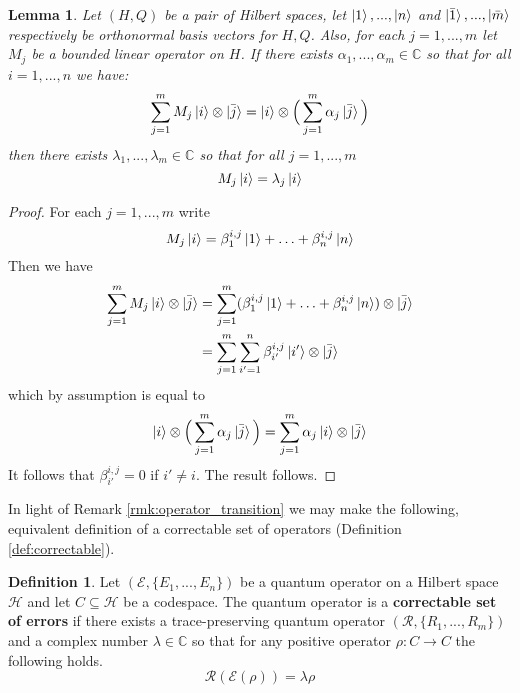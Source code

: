 \documentclass[12pt]{article}
\theoremstyle{plain}
\newtheorem{lemma}[thm]{Lemma}
\theoremstyle{definition}
\newtheorem{defn}[thm]{Definition} %
\newcommand{\bb}[1]{\mathbb{#1}}
\newcommand{\call}[1]{\mathcal{#1}}
\newcommand{\lto}{\longrightarrow}
\begin{document}
\begin{lemma}\label{lem:operator_preliminary}
	Let $(H,Q)$ be a pair of Hilbert spaces, let $\ket{1},...,\ket{n}$ and $\ket{\bar{1}},...,\ket{\bar{m}}$ respectively be orthonormal basis vectors for $H,Q$. Also, for each $j = 1,...,m$ let $M_j$ be a bounded linear operator on $H$. If there exists $\alpha_1,...,\alpha_m \in \bb{C}$ so that for all $i = 1,...,n$ we have:
	\begin{equation}
		\sum_{j = 1}^mM_j\ket{i} \otimes \ket{\bar{j}} = \ket{i} \otimes \Big(\sum_{j= 1}^m \alpha_{j} \ket{\bar{j}}\Big)
	\end{equation}
	then there exists $\lambda_1,...,\lambda_m \in \bb{C}$ so that for all $j = 1,...,m$
	\begin{equation}
		M_j\ket{i} = \lambda_j \ket{i}
	\end{equation}
\end{lemma}
\begin{proof}
	For each $j = 1,...,m$ write
	\begin{equation}
		M_j\ket{i} = \beta^{i,j}_1\ket{1} + \hdots + \beta^{i,j}_n \ket{n}
	\end{equation}
	Then we have
	\begin{align*}
		\sum_{j = 1}^mM_j\ket{i} \otimes \ket{\bar{j}} &= \sum_{j = 1}^m(\beta^{i,j}_1\ket{1} + \hdots + \beta^{i,j}_n \ket{n}) \otimes \ket{\bar{j}}\\
		&= \sum_{j=1}^m\sum_{i' = 1}^n \beta_{i'}^{i,j} \ket{i'} \otimes \ket{\bar{j}}
	\end{align*}
	which by assumption is equal to
	\begin{equation}
		\ket{i} \otimes \Big(\sum_{j = 1}^m \alpha_{j} \ket{\bar{j}}\Big) = \sum_{j = 1}^m \alpha_j \ket{i} \otimes \ket{\bar{j}}
	\end{equation}
	It follows that $\beta_{i'}^{i,j} = 0$ if $i' \neq i$. The result follows.
\end{proof}

	In light of Remark \ref{rmk:operator_transition} we may make the following, equivalent definition of a correctable set of operators (Definition \ref{def:correctable}).
	\begin{defn}\label{def:correctable_errors}
		Let $(\call{E}, \lbrace E_1,...,E_n\rbrace)$ be a quantum operator on a Hilbert space $\call{H}$ and let $C \subseteq \call{H}$ be a codespace. The quantum operator is a \textbf{correctable set of errors} if there exists a trace-preserving quantum operator $(\call{R}, \lbrace R_1,...,R_m\rbrace)$ and a complex number $\lambda \in \bb{C}$ so that for any positive operator $\rho: C \lto C$ the following holds.
		\begin{equation}
			\call{R}(\call{E}(\rho)) = \lambda \rho
		\end{equation}
	\end{defn}
\end{document}
